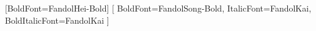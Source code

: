 
\usepackage{fontspec}
\usepackage{xeCJK}

[BoldFont=FandolHei-Bold]
[
  BoldFont=FandolSong-Bold,
  ItalicFont=FandolKai,
  BoldItalicFont=FandolKai
]

\setmainfont{TeX Gyre Termes}
\setsansfont{TeX Gyre Heros}


\usepackage{amsmath,amssymb}
\usepackage{booktabs}
\usepackage{multicol}

\hypersetup{colorlinks=true,linkcolor=.,citecolor=peaking,urlcolor=peaking!70!black}


\newcommand{\hl}[1]{\textcolor{peaking}{\textbf{#1}}}
\newcommand{\luogu}[2]{\href{https://www.luogu.com.cn/problem/#1}{\texttt{#1}\,\textnormal{#2}}}
